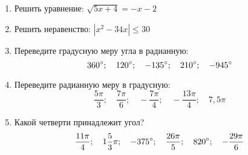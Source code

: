 \documentclass[12pt, a4paper]{article}
\begin{document}
	
	
	\begin{enumerate}
		\item Решить уравнение:
		$\sqrt{5x+4}=-x-2$
		\item Решить неравенство:
		$|x^2-34x|\leq30$
		\item Переведите градусную меру угла в радианную:
		$$360\degree;\quad 120\degree;\quad -135\degree;\quad 210\degree;\quad -945\degree$$
		
		\item Переведите радианную меру в градусную:
		$$\dfrac{5\pi}{3};\quad \dfrac{7\pi}{6};\quad -\dfrac{7\pi}{4};\quad -\dfrac{13\pi}{4};\quad 7,5\pi$$
		
		\item Какой четверти принадлежит угол?
		$$\dfrac{11\pi}{4};\quad 1\dfrac{5}{3}\pi;\quad -375\degree;\quad \dfrac{26\pi}{5};\quad 820\degree;\quad -\dfrac{29\pi}{6}$$
		

\end{enumerate}
\end{document}
